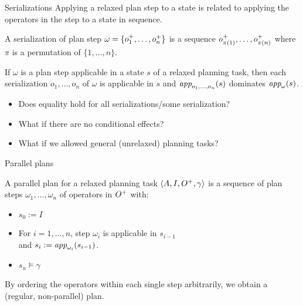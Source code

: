 \documentclass{gkibeamer}
\begin{document}
\begin{frame}{Serializations}
  Applying a relaxed plan step to a state is related to applying
  the operators in the step to a state in sequence.
  \begin{definition}[serialization]
    A \alert{serialization} of plan step 
    $\omega = \{{o}^+_1, \dots, {o}^+_n\}$ is a sequence
    ${o}^+_{\pi(1)}, \dots, {o}^+_{\pi(n)}$ where
    $\pi$ is a permutation of $\{1, \dots, n\}$.
  \end{definition}

  \begin{lemma}
    If $\omega$ is a plan step applicable in a state $s$ of a
    relaxed planning task, then each serialization $o_1, \dots, o_n$
    of $\omega$ is applicable in $s$ and
    $\textit{app}_{o_1, \dots, o_n}(s)$ dominates
    $\textit{app}_{\omega}(s)$.
  \end{lemma}

  \begin{itemize}
  \item Does equality hold for all serializations/some serialization?
  \item What if there are no conditional effects?
  \item What if we allowed general (unrelaxed) planning tasks?
  \end{itemize}
\end{frame}

\begin{frame}{Parallel plans}
  \begin{definition}
    A \alert{parallel plan} for a relaxed planning task
    $\langle A, I, {O}^+, \gamma\rangle$
    is a sequence of plan steps $\omega_1, \dots, \omega_n$
    of operators in ${O}^+$ with:
    \begin{itemize}
    \item $s_0 := I$
    \item For $i = 1, \dots, n$, step $\omega_i$ is applicable in
      $s_{i-1}$ \\
      and $s_i := \textit{app}_{\omega_i}(s_{i-1})$.
    \item $s_n \models \gamma$
    \end{itemize}
  \end{definition}
  
  By ordering the operators within each single step arbitrarily, we
  obtain a (regular, non-parallel) plan.
\end{frame}
\end{document}
